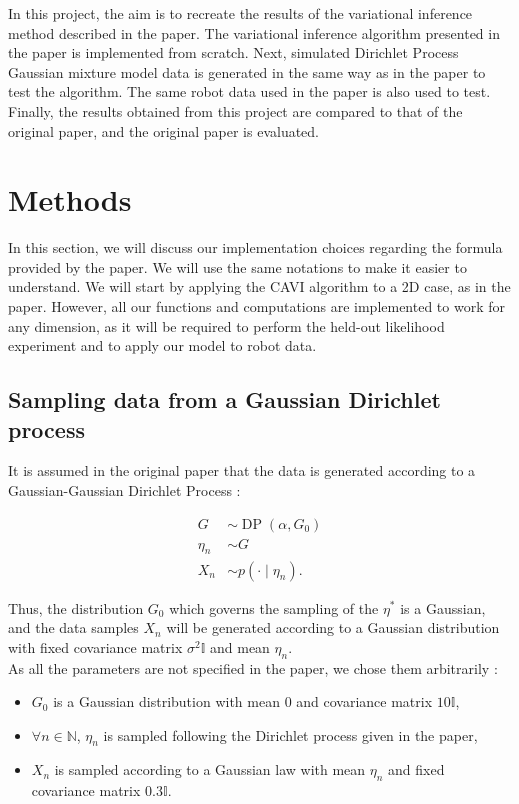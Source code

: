 \documentclass{article}
\begin{document}
In this project, the aim is to recreate the results of the variational inference method described in the paper. The variational inference algorithm presented in the paper is implemented from scratch. Next, simulated Dirichlet Process Gaussian mixture model data is generated in the same way as in the paper to test the algorithm. The same robot data used in the paper is also used to test. Finally, the results obtained from this project are compared to that of the original paper, and the original paper is evaluated. 

\section{Methods}

In this section, we will discuss our implementation choices regarding the formula provided by the paper. We will use the same notations to make it easier to understand. We will start by applying the CAVI algorithm to a 2D case, as in the paper. However, all our functions and computations are implemented to work for any dimension, as it will be required to perform the held-out likelihood experiment and to apply our model to robot data.

\subsection{Sampling data from a Gaussian Dirichlet process}
It is assumed in the original paper that the data is generated according to a Gaussian-Gaussian Dirichlet Process :

$$
\begin{aligned}
G & \sim \operatorname{DP}\left(\alpha, G_0\right) \\
\eta_n & \sim G \\
X_n & \sim p\left(\cdot \mid \eta_n\right) .
\end{aligned}
$$

Thus, the distribution $G_0$ which governs the sampling of the $\eta^*$ is a Gaussian, and the data samples $X_n$ will be generated according to a Gaussian distribution with fixed covariance matrix $\sigma^2\mathbb{I}$ and mean $\eta_n$. \\

As all the parameters are not specified in the paper, we chose them arbitrarily :
\begin{itemize}
    \item $G_0$ is a Gaussian distribution with mean $0$ and covariance matrix $10\mathbb{I}$,
    \item $\forall n \in \mathbb{N}$, $\eta_n$ is sampled following the Dirichlet process given in the paper,
    \item $X_n$ is sampled according to a Gaussian law with mean $\eta_n$ and fixed covariance matrix $0.3\mathbb{I}$.
\end{itemize}
\end{document}
